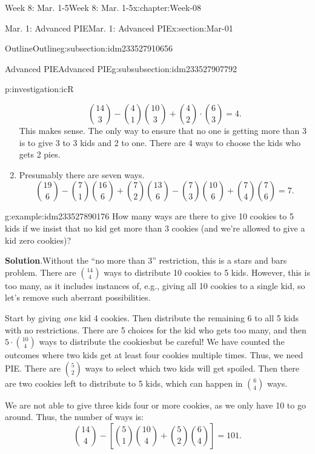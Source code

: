 \documentclass[oneside,10pt,]{book}
\newcommand{\blocktitlefont}{\relax}
\numberwithin{equation}{section}
\begin{document}
\begin{chapterptx}{Week 8: Mar. 1-5}{}{Week 8: Mar. 1-5}{}{}{x:chapter:Week-08}
\begin{sectionptx}{Mar. 1: Advanced PIE}{}{Mar. 1: Advanced PIE}{}{}{x:section:Mar-01}
\begin{subsectionptx}{Outline}{}{Outline}{}{}{g:subsection:idm233527910656}
\begin{subsubsectionptx}{Advanced PIE}{}{Advanced PIE}{}{}{g:subsubsection:idm233527907792}
\begin{investigation}{}{p:investigation:icR}
\begin{enumerate}
\begin{equation*}
\binom{14}{3} - \binom{4}{1}\binom{10}{3} + \binom{4}{2}\cdot \binom{6}{3}= 4.
\end{equation*}
This makes sense. The only way to ensure that no one is getting more than 3 is to give 3 to 3 kids and 2 to one. There are 4 ways to choose the kids who gets 2 pies.%
\item{}Presumably there are seven ways.%
\begin{equation*}
\binom{19}{6} - \binom{7}{1}\binom{16}{6} + \binom{7}{2}\binom{13}{6}-\binom{7}{3}\binom{10}{6}+\binom{7}{4}\binom{7}{6} = 7.
\end{equation*}
%
\end{enumerate}
\end{investigation}%
\begin{example}{}{g:example:idm233527890176}%
How many ways are there to give 10 cookies to 5 kids if we insist that no kid get more than 3 cookies (and we're allowed to give a kid zero cookies)?%
\par\smallskip%
\noindent\textbf{\blocktitlefont Solution}.\hypertarget{g:solution:idm233527889632}{}\quad{}Without the ``no more than 3'' restriction, this is a stars and bars problem. There are \(\binom{14}{4}\) ways to distribute 10 cookies to 5 kids. However, this is too many, as it includes instances of, e.g., giving all 10 cookies to a single kid, so let's remove such aberrant possibilities.%
\par
Start by giving \emph{one} kid 4 cookies. Then distribute the remaining 6 to all 5 kids with no restrictions. There are 5 choices for the kid who gets too many, and then \(5\cdot\binom{10}{4}\) ways to distribute the cookies\textemdash{}but be careful! We have counted the outcomes where two kids get at least four cookies multiple times. Thus, we need PIE. There are \(\binom{5}{2}\) ways to select which two kids will get spoiled. Then there are two cookies left to distribute to 5 kids, which can happen in \(\binom{6}{4}\) ways.%
\par
We are not able to give three kids four or more cookies, as we only have 10 to go around. Thus, the number of ways is:%
\begin{equation*}
\binom{14}{4} - \left[\binom{5}{1} \binom{10}{4} + \binom{5}{2}\binom{6}{4}\right] = 101.
\end{equation*}
%
\end{example}
\end{subsubsectionptx}
%
%
\typeout{************************************************}

\end{subsectionptx}
\end{sectionptx}
\end{chapterptx}
\end{document}
